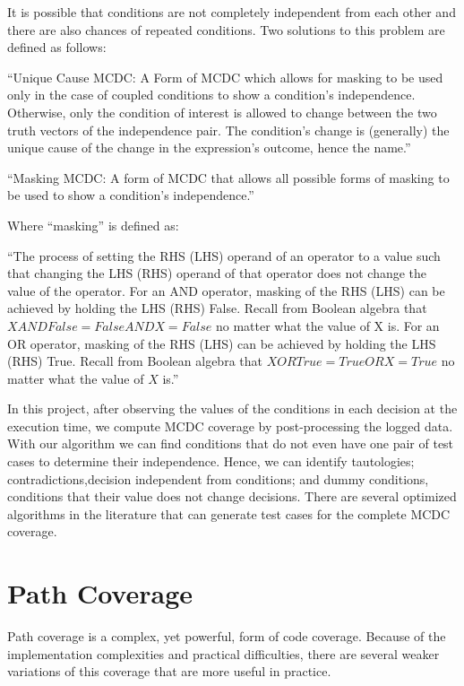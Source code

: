 \documentclass[12pt,a4paper]{report}
\begin{document}
It is possible that conditions are not completely independent from each other and there are also chances of repeated conditions. Two solutions to this problem are defined as follows:

``Unique Cause MCDC: A Form of MCDC which allows for masking to be used only in the case of coupled conditions to show a condition’s independence. Otherwise, only the condition of interest is allowed to change between the two truth vectors of the independence pair. The condition’s change is (generally) the unique cause of the change in the expression’s outcome, hence the name.''\cite{chilenski2001investigation}

``Masking MCDC: A form of MCDC that allows all possible forms of masking to be used to show a condition’s independence.''\cite{chilenski2001investigation}

Where ``masking'' is defined as:

``The process of setting the RHS (LHS) operand of an operator to a value such that changing the LHS (RHS) operand of that operator does not change the value of the operator. For an AND operator, masking of the RHS (LHS) can be achieved by holding the LHS (RHS) False.  Recall from Boolean algebra that $X AND False = False AND X = False$ no matter what the value of X is. For an OR operator, masking of the RHS (LHS) can be achieved by holding the LHS (RHS) True. Recall from Boolean algebra that $X OR True = True OR X = True$ no matter what the value of $X$ is.'' \cite{chilenski2001investigation}

In this project, after observing the values of the conditions in each decision at the execution time, we compute MCDC coverage by post-processing the logged data. With our algorithm we can find conditions that do not even have one pair of test cases to determine their independence. Hence, we can identify tautologies; contradictions,decision independent from conditions; and dummy conditions, conditions that their value does not change decisions. There are several optimized algorithms in the literature that can generate test cases for the complete MCDC coverage.

\section{Path Coverage}
Path coverage is a complex, yet powerful, form of code coverage. Because of the implementation complexities and practical difficulties, there are several weaker variations of this coverage that are more useful in practice. 
\end{document}

